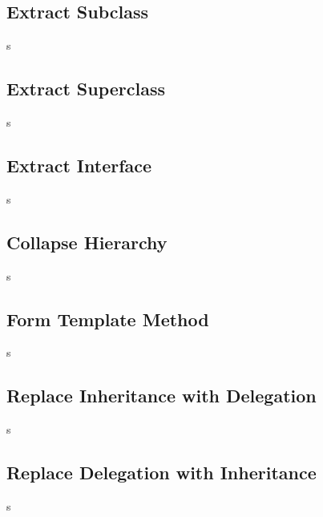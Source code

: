 \documentclass[a4paper,twoside,12pt,openright]{report}
\begin{document}
\subsection{Extract Subclass}
s
\subsection{Extract Superclass}
s
\subsection{Extract Interface}
s
\subsection{Collapse Hierarchy}
s
\subsection{Form Template Method}
s
\subsection{Replace Inheritance with Delegation}
s
\subsection{Replace Delegation with Inheritance}
s



\end{document}
